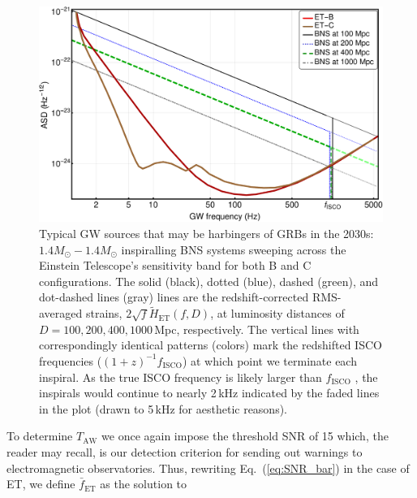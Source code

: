 \documentclass[amsmath,amssymb,aps,floats,amsfonts,notitlepage,superscriptaddress,eqsecnum,nofootinbib,10pt]{revtex4-1}
\begin{document}
\begin{figure}[h!]
\includegraphics[width=\linewidth]{../Figures/ET_strains_redshifted.pdf}
\caption{Typical GW sources that may be harbingers of GRBs in the 2030s: $1.4 M_\odot-1.4 M_\odot$ inspiralling BNS systems sweeping across 
the Einstein Telescope's sensitivity band for both B and C configurations.
The solid (black), dotted (blue), dashed (green), and dot-dashed lines (gray) lines are the redshift-corrected
RMS-averaged strains, $2\sqrt{f}\tilde{H}_\text{ET}(f,D)$, at luminosity distances of $D=100, 200, 400, 1000\,$Mpc, respectively. 
The vertical lines with correspondingly identical patterns (colors) mark the redshifted ISCO frequencies ($(1+z)^{-1} f_\text{ISCO}$) at which point we terminate each inspiral.
As the true ISCO frequency is likely larger than $f_\text{ISCO}$ \cite{Marronetti:2003hx}, the inspirals would continue to nearly 2\,kHz indicated by the 
faded lines in the plot (drawn to 5\,kHz for aesthetic reasons).
}
\label{fig:ETB2030}
\end{figure}
%
%
To determine $T_\text{AW}$ we once again impose the threshold SNR of 15 which, the reader may recall, 
is our detection criterion for sending out warnings to electromagnetic observatories. Thus, rewriting Eq.~(\ref{eq:SNR_bar}) in the case of ET, we define $\bar{f}_\text{ET}$ as the solution to
\end{document}
